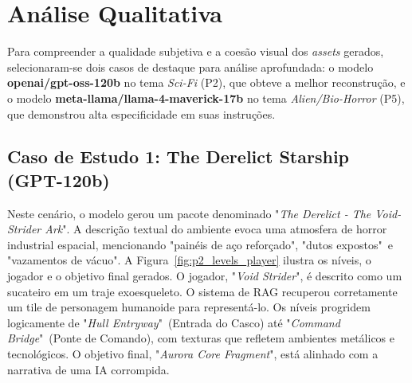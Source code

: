 \begin{table}[h!]
    \centering
\end{table}

\section{Análise Qualitativa}
\label{sec:analise_qualitativa}

Para compreender a qualidade subjetiva e a coesão visual dos \textit{assets}
gerados, selecionaram-se dois casos de destaque para análise aprofundada: o
modelo \textbf{openai/gpt-oss-120b} no tema \textit{Sci-Fi} (P2), que obteve a
melhor reconstrução, e o modelo \textbf{meta-llama/llama-4-maverick-17b} no tema
\textit{Alien/Bio-Horror} (P5), que demonstrou alta especificidade em suas
instruções.

\subsection{Caso de Estudo 1: The Derelict Starship (GPT-120b)}

Neste cenário, o modelo gerou um pacote denominado "\textit{The Derelict - The
    Void-Strider Ark}". A descrição textual do ambiente evoca uma atmosfera de
horror industrial espacial, mencionando "painéis de aço reforçado", "dutos
expostos"\ e "vazamentos de vácuo".  A Figura~\ref{fig:p2_levels_player} ilustra
os níveis, o jogador e o objetivo final gerados. O jogador, "\textit{Void
    Strider}", é descrito como um sucateiro em um traje exoesqueleto. O sistema de
RAG recuperou corretamente um tile de personagem humanoide para representá-lo.
Os níveis progridem logicamente de "\textit{Hull Entryway}"\ (Entrada do Casco)
até "\textit{Command Bridge}"\ (Ponte de Comando), com texturas que refletem
ambientes metálicos e tecnológicos. O objetivo final, "\textit{Aurora Core
    Fragment}", está alinhado com a narrativa de uma IA corrompida.

